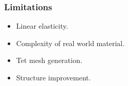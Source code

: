 \documentclass[serif,mathserif, 12pt]{beamer}
\begin{document}
\begin{frame}
  \frametitle{Limitations}
  \begin{itemize}
  \item Linear elasticity.
  \item Complexity of real world material.
  \item Tet mesh generation.
  \item Structure improvement.
  \end{itemize}
\end{frame}

\begin{frame} 
\end{frame}
\end{document}
